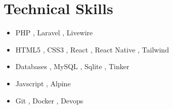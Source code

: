 \documentclass[A4,11pt]{article}
\makeatletter
\newcommand{\resumeItem}[2]{
  \item{
    \textbf{#1}{: #2 \vspace{-2pt}}
  }
}
\newcommand{\resumeSkill}[1]{
  \vspace{-1pt}\item
    \begin{tabular*}{0.97\textwidth}[t]{l@{\extracolsep{\fill}}r}
      \textbf{#1} \\
    \end{tabular*}\vspace{-5pt}
}
\newcommand{\resumeSubItem}[2]{\resumeItem{#1}{#2}\vspace{-4pt}}
\newcommand{\resumeSubHeadingListStart}{\begin{itemize}[leftmargin=*]}
\newcommand{\resumeSubHeadingListEnd}{\end{itemize}}
\makeatother
\begin{document}









\vspace{-10pt}


\section{Technical Skills}
  \vspace{10pt}
  \begin{itemize}[label=$\bullet$]
    \item{  PHP , Laravel  , Livewire  }
    \item{ HTML5 ,  CSS3 , React , React Native , Tailwind  }
    \item{ Databases  , MySQL , Sqlite , Tinker }
    \item{ Javscript , Alpine  }
    \item{ Git , Docker , Devops  }
  \end{itemize}



\end{document}
